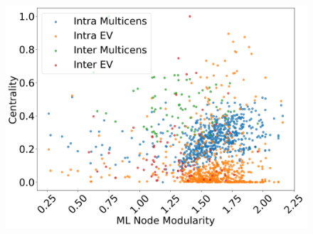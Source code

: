 \documentclass[10pt,letterpaper]{article}
\begin{document}
\begin{figure}[h!]
\begin{minipage}[b]{0.25\linewidth}
		\includegraphics[width=\textwidth]{figs/fig6.png}
		\subcaption{}
	\end{minipage}
	
	\vspace{0.5cm}
	

\end{figure}
\end{document}
